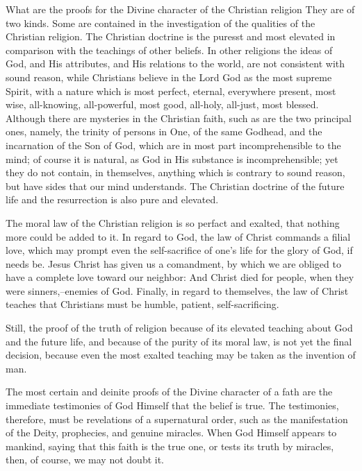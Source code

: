 What are the proofs for the Divine character of the Christian religion They are of two kinds. Some are contained in the investigation of the qualities of the Christian religion. The Christian doctrine is the puresst and most elevated in comparison with the teachings of other beliefs. In other religions the ideas of God, and His attributes, and His relations to the world, are not consistent with sound reason, while Christians believe in the Lord God as the most supreme Spirit, with a nature which is most perfect, eternal, everywhere present, most wise, all-knowing, all-powerful, most good, all-holy, all-just, most blessed. Although there are mysteries in the Christian faith, such as are the two principal ones, namely, the trinity of persons in One, of the same Godhead, and the incarnation of the Son of God, which are in most part incomprehensible to the mind; of course it is natural, as God in His substance is incomprehensible; yet they do not contain, in themselves, anything which is contrary to sound reason, but have sides that our mind understands. The Christian doctrine of the future life and the resurrection is also pure and elevated.

The moral law of the Christian religion is so perfact and exalted, that nothing more could be added to it. In regard to God, the law of Christ commands a filial love, which may prompt even the self-sacrifice of one's life for the glory of God, if needs be. Jesus Christ has given us a comandment, by which we are obliged to have a complete love toward our neighbor:   And Christ died for people, when they were sinners,--enemies of God. Finally, in regard to themselves, the law of Christ teaches that Christians must be humble, patient, self-sacrificing.

Still, the proof of the truth of religion because of its elevated teaching about God and the future life, and because of the purity of its moral law, is not yet the final decision, because even the most exalted teaching may be taken as the invention of man.

The most certain and deinite proofs of the Divine character of a fath are the immediate testimonies of God Himself that the belief is true. The testimonies, therefore, must be revelations of a supernatural order, such as the manifestation of the Deity, prophecies, and genuine miracles. When God Himself appears to mankind, saying that this faith is the true one, or tests its truth by miracles, then, of course, we may not doubt it.

